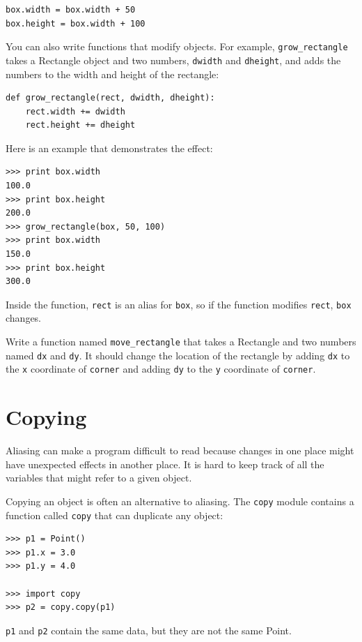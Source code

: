 \documentclass[10pt]{book}
\begin{document}
\begin{CJK}{UTF8}{gbsn}
\begin{verbatim}
box.width = box.width + 50
box.height = box.width + 100
\end{verbatim}
%
You can also write functions that modify objects.  For example,
\verb"grow_rectangle" takes a Rectangle object and two numbers,
{\tt dwidth} and {\tt dheight}, and adds the numbers to the
width and height of the rectangle:

\begin{verbatim}
def grow_rectangle(rect, dwidth, dheight):
    rect.width += dwidth
    rect.height += dheight
\end{verbatim}
%
Here is an example that demonstrates the effect:

\begin{verbatim}
>>> print box.width
100.0
>>> print box.height
200.0
>>> grow_rectangle(box, 50, 100)
>>> print box.width
150.0
>>> print box.height
300.0
\end{verbatim}
%
Inside the function, {\tt rect} is an
alias for {\tt box}, so if the function modifies {\tt rect}, 
{\tt box} changes.

\begin{exercise}

Write a function named \verb"move_rectangle" that takes
a Rectangle and two numbers named {\tt dx} and {\tt dy}.  It
should change the location of the rectangle by adding {\tt dx}
to the {\tt x} coordinate of {\tt corner} and adding {\tt dy}
to the {\tt y} coordinate of {\tt corner}.

\end{exercise}


\section{Copying}
\label{copying}

Aliasing can make a program difficult to read because changes
in one place might have unexpected effects in another place.
It is hard to keep track of all the variables that might refer
to a given object.

Copying an object is often an alternative to aliasing.
The {\tt copy} module contains a function called {\tt copy} that
can duplicate any object:

\begin{verbatim}
>>> p1 = Point()
>>> p1.x = 3.0
>>> p1.y = 4.0

>>> import copy
>>> p2 = copy.copy(p1)
\end{verbatim}
%
{\tt p1} and {\tt p2} contain the same data, but they are
not the same Point.


\end{CJK}
\end{document}
